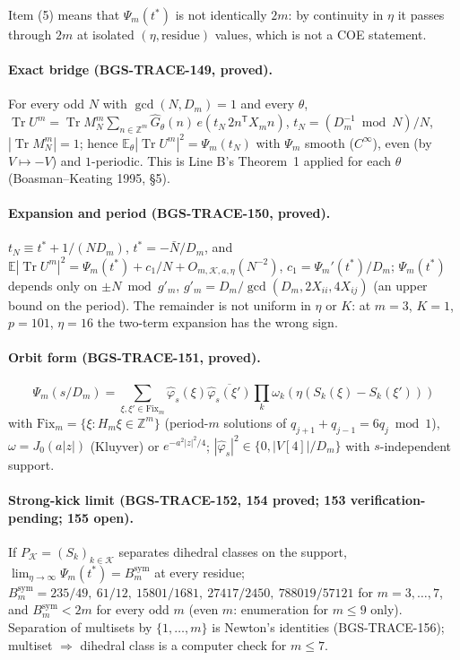 Item (5) means that \(\Psi_m(t^*)\) is not identically \(2m\): by continuity in \(\eta\) it passes through \(2m\) at isolated \((\eta,\text{residue})\) values, which is not a COE statement.

\paragraph{Exact bridge (BGS-TRACE-149, proved).} For every odd \(N\) with \(\gcd(N,D_m)=1\) and every \(\theta\),
\(\operatorname{Tr}U^m=\operatorname{Tr}M_N^m\sum_{n\in\mathbb Z^m}\widehat G_\theta(n)\,e(t_N\,2n^{\mathsf T}X_mn)\),
\(t_N=(D_m^{-1}\bmod N)/N\), \(|\operatorname{Tr}M_N^m|=1\); hence \(\mathbb E_\theta|\operatorname{Tr}U^m|^2=\Psi_m(t_N)\) with
\(\Psi_m\) smooth (\(C^\infty\)), even (by \(V\mapsto-V\)) and \(1\)-periodic. This is Line B's Theorem~1 applied for each
\(\theta\) (Boasman--Keating 1995, \S5).

\paragraph{Expansion and period (BGS-TRACE-150, proved).} \(t_N\equiv t^*+1/(ND_m)\), \(t^*=-\bar N/D_m\), and
\(\mathbb E|\operatorname{Tr}U^m|^2=\Psi_m(t^*)+c_1/N+O_{m,\mathcal K,a,\eta}(N^{-2})\), \(c_1=\Psi_m'(t^*)/D_m\);
\(\Psi_m(t^*)\) depends only on \(\pm N\bmod g'_m\), \(g'_m=D_m/\gcd(D_m,2X_{ii},4X_{ij})\) (an upper bound on the period).
The remainder is not uniform in \(\eta\) or \(K\): at \(m=3\), \(K=1\), \(p=101\), \(\eta=16\) the two-term expansion has the wrong sign.

\paragraph{Orbit form (BGS-TRACE-151, proved).} \[\Psi_m(s/D_m)=\sum_{\xi,\xi'\in\mathrm{Fix}_m}\hat\varphi_s(\xi)\overline{\hat\varphi_s(\xi')}
\prod_k\omega_k(\eta(S_k(\xi)-S_k(\xi')))\] with \(\mathrm{Fix}_m=\{\xi:H_m\xi\in\mathbb Z^m\}\) (period-\(m\) solutions of
\(q_{j+1}+q_{j-1}=6q_j\bmod1\)), \(\omega=J_0(a|z|)\) (Kluyver) or \(e^{-a^2|z|^2/4}\);
\(|\hat\varphi_s|^2\in\{0,|V[4]|/D_m\}\) with \(s\)-independent support.

\paragraph{Strong-kick limit (BGS-TRACE-152, 154 proved; 153 verification-pending; 155 open).}
If \(P_{\mathcal K}=(S_k)_{k\in\mathcal K}\) separates dihedral classes on the support,
\(\lim_{\eta\to\infty}\Psi_m(t^*)=B_m^{\mathrm{sym}}\) at every residue; \(B_m^{\mathrm{sym}}=235/49,\ 61/12,\ 15801/1681,\ 27417/2450,\ 788019/57121\)
for \(m=3,\dots,7\), and \(B_m^{\mathrm{sym}}<2m\) for every odd \(m\) (even \(m\): enumeration for \(m\le9\) only).
Separation of multisets by \(\{1,\dots,m\}\) is Newton's identities (BGS-TRACE-156); multiset \(\Rightarrow\) dihedral class is a
computer check for \(m\le7\).

